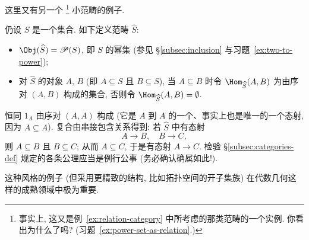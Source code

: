 \begin{example}
\label{ex:power-set-category}
这里又有另一个%
\footnote{事实上, 这又是例~\ref{ex:relation-category} 中所考虑的那类范畴的一个实例. 你看出为什么了吗? (习题~\ref{ex:power-set-as-relation}.)}%
小范畴的例子.

仍设 $S$ 是一个集合. 如下定义范畴 $\widehat{S}$:
\begin{itemize}
	\item $\Obj(\widehat{S}) = \mathscr{P}(S)$, 即 $S$ 的幂集 (参见 \S\ref{subsec:inclusion} 与习题~\ref{ex:two-to-power});
	\item 对 $\widehat{S}$ 的对象 $A$, $B$ (即 $A \subseteq S$ 且 $B \subseteq S$), 当 $A \subseteq B$ 时令 $\Hom_{\widehat{S}}(A, B)$ 为由序对 $(A,B)$ 构成的集合, 否则令 $\Hom_{\widehat{S}}(A, B) = \emptyset$.
\end{itemize}
恒同 $1_A$ 由序对 $(A,A)$ 构成 (它是 $A$ 到 $A$ 的一个、事实上也是唯一的一个态射, 因为 $A \subseteq A$). 复合由串接包含关系得到: 若 $\widehat{S}$ 中有态射
\[
A \to B, \quad B \to C,
\]
则 $A \subseteq B$ 且 $B \subseteq C$; 从而 $A \subseteq C$, 于是有态射 $A \to C$. 检验 \S\ref{subsec:categories-def} 规定的各条公理应当是例行公事 (务必确认确属如此!).

这种风格的例子 (但采用更精致的结构, 比如拓扑空间的开子集族) 在代数几何这样的成熟领域中极为重要.
\end{example}

